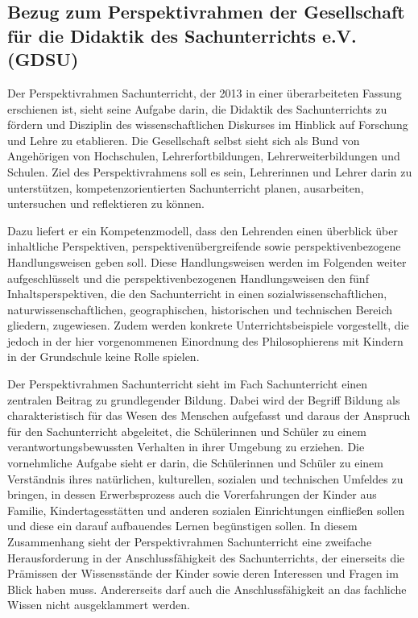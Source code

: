 \newpage
\subsection{Bezug zum Perspektivrahmen der Gesellschaft für die Didaktik des Sachunterrichts  e.V. (GDSU)}

Der Perspektivrahmen Sachunterricht, der 2013 in einer überarbeiteten Fassung erschienen ist, sieht seine Aufgabe darin, die Didaktik des Sachunterrichts zu fördern und Disziplin des wissenschaftlichen Diskurses im Hinblick auf Forschung und Lehre zu etablieren. 
Die Gesellschaft selbst sieht sich als Bund von Angehörigen von Hochschulen, Lehrerfortbildungen, Lehrerweiterbildungen und Schulen. 
Ziel des Perspektivrahmens soll es sein, Lehrerinnen und Lehrer darin zu unterstützen, kompetenzorientierten Sachunterricht planen, ausarbeiten, untersuchen und reflektieren zu können.

Dazu liefert er ein Kompetenzmodell, dass den Lehrenden einen überblick über inhaltliche Perspektiven, perspektivenübergreifende sowie perspektivenbezogene Handlungsweisen geben soll. 
Diese Handlungsweisen werden im Folgenden weiter aufgeschlüsselt und die perspektivenbezogenen Handlungsweisen den fünf Inhaltsperspektiven, die den Sachunterricht in einen sozialwissenschaftlichen, naturwissenschaftlichen, geographischen, historischen und technischen Bereich gliedern, zugewiesen\cite{GDS13, S.5f}.
 Zudem werden konkrete Unterrichtsbeispiele vorgestellt, die jedoch in der hier vorgenommenen Einordnung des Philosophierens mit Kindern in der Grundschule keine Rolle spielen.
 
Der Perspektivrahmen Sachunterricht sieht im Fach Sachunterricht einen \glqq zentralen Beitrag zu grundlegender Bildung\grqq{}\cite{GDS13, S.9}.
Dabei wird der Begriff Bildung als charakteristisch für das Wesen des Menschen aufgefasst und daraus der Anspruch für den Sachunterricht abgeleitet, die Schülerinnen und Schüler zu einem verantwortungsbewussten Verhalten in ihrer Umgebung zu erziehen. 
Die vornehmliche Aufgabe sieht er darin, die Schülerinnen und Schüler zu einem Verständnis ihres natürlichen, kulturellen, sozialen und technischen Umfeldes zu bringen, in dessen Erwerbsprozess auch die Vorerfahrungen der Kinder aus Familie, Kindertagesstätten und anderen sozialen Einrichtungen einfließen sollen und diese ein darauf aufbauendes Lernen begünstigen sollen. 
In diesem Zusammenhang sieht der Perspektivrahmen Sachunterricht eine zweifache Herausforderung in der Anschlussfähigkeit des Sachunterrichts, der einerseits die Prämissen der Wissensstände der Kinder sowie deren Interessen und Fragen im Blick haben muss. 
Andererseits darf auch die Anschlussfähigkeit an das fachliche Wissen nicht ausgeklammert werden. 

